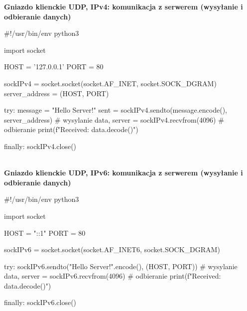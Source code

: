 \noindent \textbf{Gniazdo klienckie UDP, IPv4: komunikacja z serwerem (wysyłanie i odbieranie danych)}

\begin{code}
#!/usr/bin/env python3

import socket

HOST = '127.0.0.1'
PORT = 80

sockIPv4 = socket.socket(socket.AF_INET, socket.SOCK_DGRAM)
server_address = (HOST, PORT)

try:
    message = "Hello Server!"
    sent = sockIPv4.sendto(message.encode(), server_address)		# wysylanie
    data, server = sockIPv4.recvfrom(4096)																				# odbieranie
    print(f"Received: {data.decode()}")

finally:
    sockIPv4.close()
\end{code}\mbox{}\\

\noindent \textbf{Gniazdo klienckie UDP, IPv6: komunikacja z serwerem (wysyłanie i odbieranie danych)}

\begin{code}
#!/usr/bin/env python3

import socket

HOST = "::1"
PORT = 80

sockIPv6 = socket.socket(socket.AF_INET6, socket.SOCK_DGRAM)

try:
    sockIPv6.sendto("Hello Server!".encode(), (HOST, PORT))			# wysylanie
    data, server = sockIPv6.recvfrom(4096)																				# odbieranie
    print(f"Received: {data.decode()}")

finally:
    sockIPv6.close()
\end{code}

